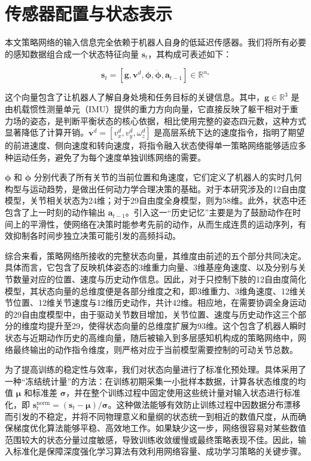 \section{传感器配置与状态表示}
\label{sec:sensor_state}

本文策略网络的输入信息完全依赖于机器人自身的低延迟传感器。我们将所有必要的感知数据组合成一个状态特征向量 $\mathbf{s}_t$，其构成可表述如下：

\begin{equation}
\mathbf{s}_t = [\mathbf{g}, \mathbf{v}^d, \bm{\phi}, \dot{\bm{\phi}}, \mathbf{a}_{t-1}] \in \mathbb{R}^{n_s}
\label{eq:state_vector}
\end{equation}

这个向量包含了让机器人了解自身处境和任务目标的关键信息。其中，$\mathbf{g} \in \mathbb{R}^3$ 是由机载惯性测量单元（IMU）提供的重力方向向量，它直接反映了躯干相对于重力场的姿态，是判断平衡状态的核心依据，相比使用完整的姿态四元数，这种方式显著降低了计算开销。$\mathbf{v}^d = [v_x^d, v_y^d, \omega_z^d]$ 是高层系统下达的速度指令，指明了期望的前进速度、侧向速度和转向速度，将指令融入状态使得单一策略网络能够适应多种运动任务，避免了为每个速度单独训练网络的需要。

$\bm{\phi}$ 和 $\dot{\bm{\phi}}$ 分别代表了所有关节的当前位置和角速度，它们定义了机器人的实时几何构型与运动趋势，是做出任何动力学合理决策的基础。对于本研究涉及的12自由度模型，关节相关状态为24维；对于29自由度全身模型，则为58维。此外，状态中还包含了上一时刻的动作输出 $\mathbf{a}_{t-1}$。引入这一“历史记忆”主要是为了鼓励动作在时间上的平滑性，使网络在决策时能参考先前的动作，从而生成连贯的运动序列，有效抑制各时间步独立决策可能引发的高频抖动。

综合来看，策略网络所接收的完整状态向量，其维度由前述的五个部分共同决定。具体而言，它包含了反映机体姿态的3维重力向量、3维基座角速度、以及分别与关节数量对应的位置、速度与历史动作信息。因此，对于只控制下肢的12自由度简化模型，其状态向量的总维度便是各部分维度之和，即3维重力、3维角速度、12维关节位置、12维关节速度与12维历史动作，共计42维。相应地，在需要协调全身运动的29自由度模型中，由于驱动关节数目增加，关节位置、速度与历史动作这三个部分的维度均提升至29，使得状态向量的总维度扩展为93维。这个包含了机器人瞬时状态与近期动作历史的高维向量，随后被输入到多层感知机构成的策略网络中，网络最终输出的动作指令维度，则严格对应于当前模型需要控制的可动关节总数。

为了提高训练的稳定性与效率，我们对状态向量进行了标准化预处理。具体采用了一种“冻结统计量”的方法：在训练初期采集一小批样本数据，计算各状态维度的均值 $\bm{\mu}$ 和标准差 $\bm{\sigma}$，并在整个训练过程中固定使用这些统计量对输入状态进行标准化，即 $\mathbf{s}_t^{\text{norm}} = (\mathbf{s}_t - \bm{\mu}) / \bm{\sigma}$。这种做法能够有效防止训练过程中因数据分布漂移而引发的不稳定，并将不同物理意义和量纲的状态统一到相近的数值尺度，从而确保梯度优化算法能够平稳、高效地工作。如果缺少这一步，网络很容易对某些数值范围较大的状态分量过度敏感，导致训练收敛缓慢或最终策略表现不佳。因此，输入标准化是保障深度强化学习算法有效利用网络容量、成功学习策略的关键步骤。


